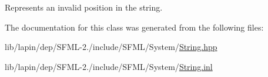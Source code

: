 Represents an invalid position in the string. 



The documentation for this class was generated from the following files\-:\begin{DoxyCompactItemize}
\item 
lib/lapin/dep/\-S\-F\-M\-L-\/2./include/\-S\-F\-M\-L/\-System/\hyperlink{lapin_2dep_2_s_f_m_l-2_83_2include_2_s_f_m_l_2_system_2_string_8hpp}{String.\-hpp}\item 
lib/lapin/dep/\-S\-F\-M\-L-\/2./include/\-S\-F\-M\-L/\-System/\hyperlink{lapin_2dep_2_s_f_m_l-2_83_2include_2_s_f_m_l_2_system_2_string_8inl}{String.\-inl}\end{DoxyCompactItemize}
